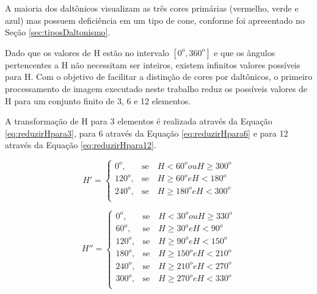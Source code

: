 \documentclass[	12pt, Times, openright, twoside, a4paper, english, brazil]{abntex2}
\begin{document}
A maioria dos daltônicos visualizam as três cores primárias (vermelho, verde e azul) mas possuem deficiência em um tipo de cone, conforme foi apresentado no Seção \ref{sec:tiposDaltonismo}. 

Dado que os valores de H estão no intervalo $[0^o, 360^o]$ e que os ângulos pertencentes a H não necessitam ser inteiros, existem infinitos valores possíveis para H. Com o objetivo de facilitar a distinção de cores por daltônicos, o primeiro processamento de imagem executado neste trabalho reduz os possíveis valores de H para um conjunto finito de 3, 6 e 12 elementos.

A transformação de H para 3 elementos é realizada através da Equação \ref{eq:reduzirHpara3}, para 6 através da Equação \ref{eq:reduzirHpara6} e para 12 através da Equação \ref{eq:reduzirHpara12}. 

\begin{equation}
\label{eq:reduzirHpara3}
H'=\left\{
\begin{array}{rc}
    0^o,&\mbox{se}\quad H <60^o ou H \geq 300^o \\
    120^o,&\mbox{se}\quad H \geq 60^o e H < 180^o \\
    240^o,&\mbox{se}\quad H \geq 180^o e H < 300^o \\
\end{array}\right.
\end{equation}

\begin{equation}
\label{eq:reduzirHpara6}
H''=\left\{
\begin{array}{rc}
    0^o,&\mbox{se}\quad H <30^o ou H \geq 330^o \\
    60^o,&\mbox{se}\quad H \geq 30^o e H < 90^o \\
    120^o,&\mbox{se}\quad H \geq 90^o e H < 150^o \\
    180^o,&\mbox{se}\quad H \geq 150^o e H < 210^o \\
    240^o,&\mbox{se}\quad H \geq 210^o e H < 270^o \\
    300^o,&\mbox{se}\quad H \geq 270^o e H < 330^o \\
\end{array}\right.
\end{equation}
\end{document}
